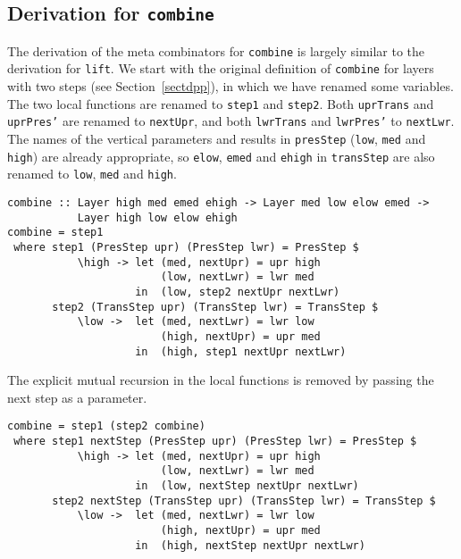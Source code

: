 \subsection{Derivation for \texttt{combine}}
\label{subsubsectcombine}
\par The derivation of the meta combinators for \texttt{combine} is largely
        similar to the derivation for \texttt{lift}. We start with the original
        definition of \texttt{combine} for layers with two steps (see
        Section~\ref{sectdpp}), in which we have renamed some variables.
        The two local functions are renamed to \texttt{step1} and \texttt{step2}. Both
        \texttt{uprTrans} and \texttt{uprPres'} are renamed to \texttt{nextUpr}, and
        both \texttt{lwrTrans} and \texttt{lwrPres'} to \texttt{nextLwr}. The names of
        the vertical parameters and results in \texttt{presStep} (\texttt{low},
        \texttt{med} and \texttt{high}) are already appropriate, so \texttt{elow},
        \texttt{emed} and \texttt{ehigh} in \texttt{transStep} are also renamed to
        \texttt{low}, \texttt{med} and \texttt{high}.\begin{small}\begin{verbatim}combine :: Layer high med emed ehigh -> Layer med low elow emed -> 
           Layer high low elow ehigh
combine = step1
 where step1 (PresStep upr) (PresStep lwr) = PresStep $
           \high -> let (med, nextUpr) = upr high
                        (low, nextLwr) = lwr med
                    in  (low, step2 nextUpr nextLwr)
       step2 (TransStep upr) (TransStep lwr) = TransStep $
           \low ->  let (med, nextLwr) = lwr low
                        (high, nextUpr) = upr med
                    in  (high, step1 nextUpr nextLwr)\end{verbatim}\end{small}

\par The explicit mutual recursion in the local functions is removed by
        passing the next step as a parameter.\begin{small}\begin{verbatim}combine = step1 (step2 combine)
 where step1 nextStep (PresStep upr) (PresStep lwr) = PresStep $
           \high -> let (med, nextUpr) = upr high
                        (low, nextLwr) = lwr med
                    in  (low, nextStep nextUpr nextLwr)
       step2 nextStep (TransStep upr) (TransStep lwr) = TransStep $
           \low ->  let (med, nextLwr) = lwr low
                        (high, nextUpr) = upr med
                    in  (high, nextStep nextUpr nextLwr)\end{verbatim}\end{small}

